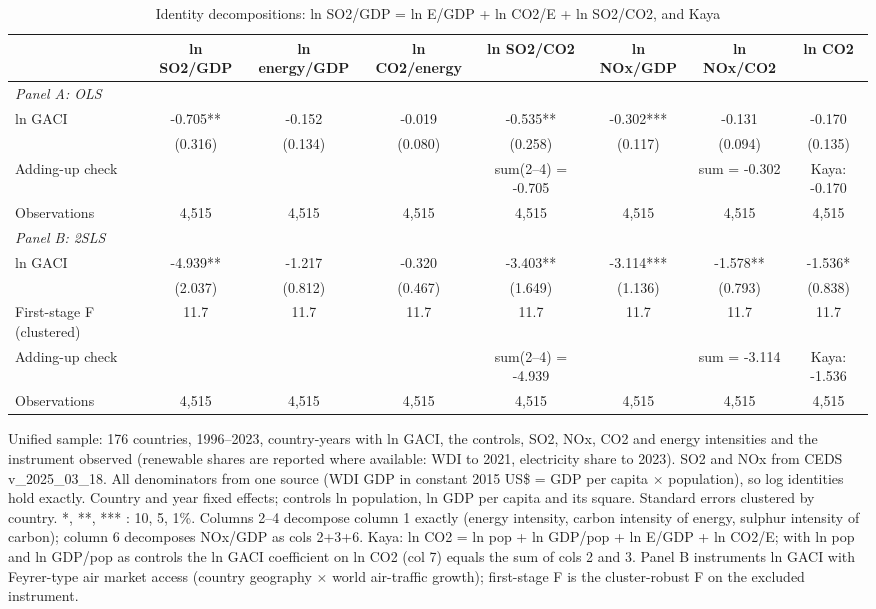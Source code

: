\begin{table}[htbp]\centering\small
\caption{Identity decompositions: ln SO2/GDP = ln E/GDP + ln CO2/E + ln SO2/CO2, and Kaya}\label{tab:T1b}
\begin{tabular}{lccccccc}
\toprule
 & ln SO2/GDP & ln energy/GDP & ln CO2/energy & ln SO2/CO2 & ln NOx/GDP & ln NOx/CO2 & ln CO2 \\
\midrule
\midrule
\multicolumn{8}{l}{\textit{Panel A: OLS}} \\
ln GACI & -0.705** & -0.152 & -0.019 & -0.535** & -0.302*** & -0.131 & -0.170 \\
 & (0.316) & (0.134) & (0.080) & (0.258) & (0.117) & (0.094) & (0.135) \\
Adding-up check &  &  &  & sum(2--4) = -0.705 &  & sum = -0.302 & Kaya: -0.170 \\
\midrule
Observations & 4,515 & 4,515 & 4,515 & 4,515 & 4,515 & 4,515 & 4,515 \\
\midrule
\multicolumn{8}{l}{\textit{Panel B: 2SLS}} \\
ln GACI & -4.939** & -1.217 & -0.320 & -3.403** & -3.114*** & -1.578** & -1.536* \\
 & (2.037) & (0.812) & (0.467) & (1.649) & (1.136) & (0.793) & (0.838) \\
First-stage F (clustered) & 11.7 & 11.7 & 11.7 & 11.7 & 11.7 & 11.7 & 11.7 \\
Adding-up check &  &  &  & sum(2--4) = -4.939 &  & sum = -3.114 & Kaya: -1.536 \\
\midrule
Observations & 4,515 & 4,515 & 4,515 & 4,515 & 4,515 & 4,515 & 4,515 \\
\bottomrule
\end{tabular}
\begin{minipage}{0.95\textwidth}\footnotesize Unified sample: 176 countries, 1996--2023, country-years with ln GACI, the controls, SO2, NOx, CO2 and energy intensities and the instrument observed (renewable shares are reported where available: WDI to 2021, electricity share to 2023). SO2 and NOx from CEDS v\_2025\_03\_18. All denominators from one source (WDI GDP in constant 2015 US\$ = GDP per capita $\times$ population), so log identities hold exactly. Country and year fixed effects; controls ln population, ln GDP per capita and its square. Standard errors clustered by country. *, **, *** : 10, 5, 1\%. Columns 2--4 decompose column 1 exactly (energy intensity, carbon intensity of energy, sulphur intensity of carbon); column 6 decomposes NOx/GDP as cols 2+3+6. Kaya: ln CO2 = ln pop + ln GDP/pop + ln E/GDP + ln CO2/E; with ln pop and ln GDP/pop as controls the ln GACI coefficient on ln CO2 (col 7) equals the sum of cols 2 and 3. Panel B instruments ln GACI with Feyrer-type air market access (country geography $\times$ world air-traffic growth); first-stage F is the cluster-robust F on the excluded instrument.\end{minipage}
\end{table}